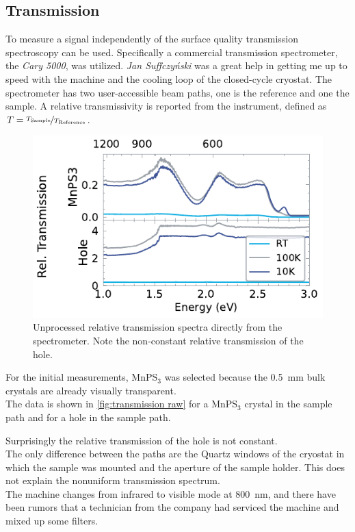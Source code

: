 \documentclass[
	twoside,
	parskip=half,
	a4paper,
]{scrbook}
\begin{document}
\subsection{Transmission}
To measure a signal independently of the surface quality transmission spectroscopy can be used.
Specifically a commercial transmission spectrometer, the \textit{Cary 5000}, was utilized.
\textit{Jan Suffczyński} was a great help in getting me up to speed with the machine and the cooling loop of the closed-cycle cryostat.
The spectrometer has two user-accessible beam paths, one is the reference and one the sample.
A relative transmissivity is reported from the instrument, defined as $T = \nicefrac{T_\text{Sample}}{T_\text{Reference}}$.
\begin{figure}[b]
	\centering
	\includegraphics{../figures/2024-03-15 MnPS3 transmission raw.pdf}
	\caption{Unprocessed relative transmission spectra directly from the spectrometer. Note the non-constant relative transmission of the hole.}
	\label{fig:transmission raw}
\end{figure}
For the initial measurements, MnPS$_3$ was selected because the \SI{.5}{mm} bulk crystals are already visually transparent.\\
The data is shown in \autoref{fig:transmission raw} for a MnPS$_3$ crystal in the sample path and for a hole in the sample path.

Surprisingly the relative transmission of the hole is not constant.\\
The only difference between the paths are the Quartz windows of the cryostat in which the sample was mounted and the aperture of the sample holder.
This does not explain the nonuniform transmission spectrum.\\
The machine changes from infrared to visible mode at \SI{800}{nm}, and there have been rumors that a technician from the company had serviced the machine and mixed up some filters.
\end{document}
